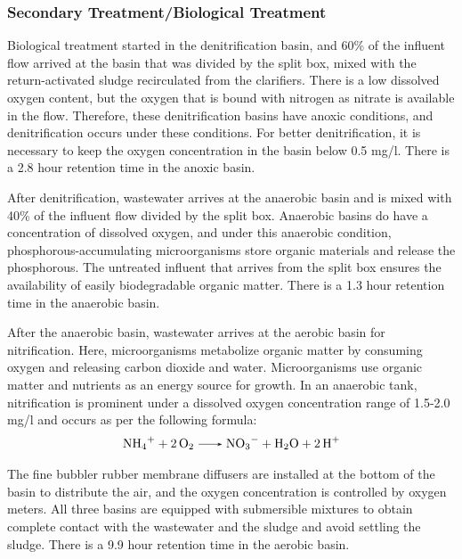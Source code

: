 \subsubsection{Secondary Treatment/Biological Treatment}
Biological treatment started in the denitrification basin, and 60\% of the influent flow arrived at the basin that was divided by the split box, mixed with the return-activated sludge recirculated from the clarifiers. There is a low dissolved oxygen content, but the oxygen that is bound with nitrogen as nitrate is available in the flow. Therefore, these denitrification basins have anoxic conditions, and denitrification occurs under these conditions. For better denitrification, it is necessary to keep the oxygen concentration in the basin below 0.5 \unit{mg/l}. There is a 2.8 \unit{hour} retention time in the anoxic basin. 

After denitrification, wastewater arrives at the anaerobic basin and is mixed with 40\% of the influent flow divided by the split box. Anaerobic basins do have a concentration of dissolved oxygen, and under this anaerobic condition, phosphorous-accumulating microorganisms store organic materials and release the phosphorous. The untreated influent that arrives from the split box ensures the availability of easily biodegradable organic matter. There is a 1.3 \unit{hour} retention time in the anaerobic basin.

After the anaerobic basin, wastewater arrives at the aerobic basin for nitrification. Here, microorganisms metabolize organic matter by consuming oxygen and releasing carbon dioxide and water. Microorganisms use organic matter and nutrients as an energy source for growth. In an anaerobic tank, nitrification is prominent under a dissolved oxygen concentration range of 1.5-2.0 \unit{mg/l} and occurs as per the following formula:
\begin{gather}
    \ce{NH4^+ + 2 O2 -> NO3-  + H2O  + 2 H+ }
\end{gather}

The fine bubbler rubber membrane diffusers are installed at the bottom of the basin to distribute the air, and the oxygen concentration is controlled by oxygen meters. All three basins are equipped with submersible mixtures to obtain complete contact with the wastewater and the sludge and avoid settling the sludge. There is a 9.9 \unit{hour} retention time in the aerobic basin.

